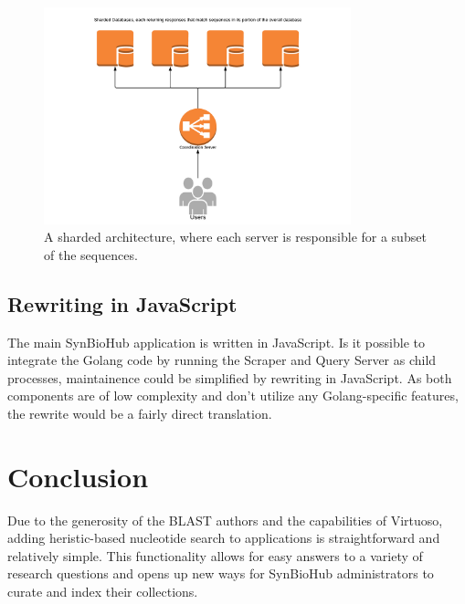 \documentclass[journal,comsoc]{IEEEtran}
\begin{document}
\begin{figure}[!t]
\centering
\includegraphics[width=3.5in]{shardedarchitecture}
\caption{A sharded architecture, where each server is responsible for a subset 
of the sequences.}
\label{sharding}
\end{figure}

\subsection{Rewriting in JavaScript}

The main SynBioHub application is written in JavaScript. Is it possible to 
integrate the Golang code by running the Scraper and Query Server as child
processes, maintainence could be simplified by rewriting in JavaScript. As 
both components are of low complexity and don't utilize any Golang-specific 
features, the rewrite would be a fairly 
direct translation. 

\section{Conclusion}


Due to the generosity of the BLAST authors and the capabilities of Virtuoso, 
adding heristic-based 
nucleotide search to applications is straightforward and relatively 
simple. This functionality allows for easy answers to a variety of research questions
and opens up new ways for SynBioHub administrators to curate and index their collections.






\end{document}
